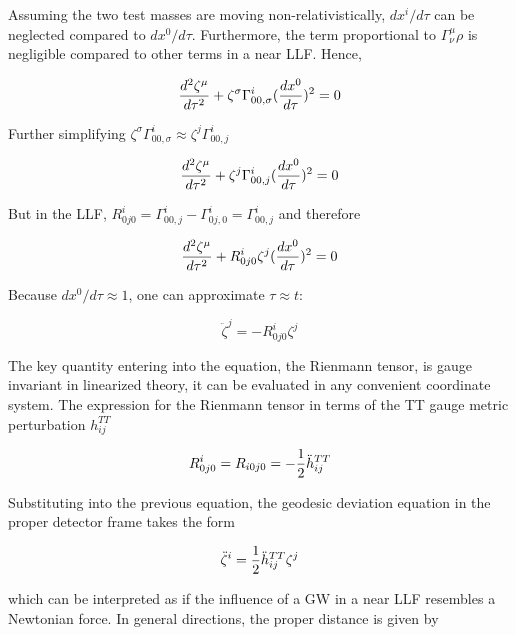 \documentclass[binding=0.6cm, LaM]{sapthesis}
\begin{document}
	Assuming the two test masses are moving non-relativistically, $dx^i/d\tau$ can be neglected compared to $dx^0/d\tau$.
	Furthermore, the term proportional to $\Gamma^{\mu}_\nu\rho{}$ is negligible compared to other terms in a near LLF. Hence,

		\begin{equation}
		{{d^2\zeta^{\mu}}\over{d\tau^2}} + \zeta^{\sigma}\Gamma^{i}_{00, \sigma}({{dx^0}\over{d\tau}})^2 = 0
		\end{equation}

	Further simplifying $\zeta^{\sigma}\Gamma^{i}_{00, \sigma} \approx \zeta^{j}\Gamma^{i}_{00, j}$

		\begin{equation}
		{{d^2\zeta^{\mu}}\over{d\tau^2}} + \zeta^{j}\Gamma^{i}_{00,j}({{dx^0}\over{d\tau}})^2 = 0
		\end{equation}

	But in the LLF, $R^i_{0j0} = \Gamma^i_{00,j} - \Gamma^i_{0j,0} = \Gamma^i_{00,j}$ and therefore

		\begin{equation}
		{{d^2\zeta^{\mu}}\over{d\tau^2}} + R^i_{0j0} \zeta^j({{dx^0}\over{d\tau}})^2 = 0
		\end{equation}

	Because $dx^0/d\tau \approx 1$, one can approximate $\tau \approx t$:

		\begin{equation}
		{\ddot \zeta}^j = - R^i_{0j0}\zeta^j
		\end{equation}
	
	The key quantity entering into the equation, the Rienmann tensor, is gauge invariant in linearized theory, 
	it can be evaluated in any convenient coordinate system.
	The expression for the Rienmann tensor in terms of the TT gauge metric perturbation $h_{ij}^{TT}$

		\begin{equation}
		R^i_{0j0} = R_{i0j0} = - {1 \over 2}{\ddot h}_{ij}^{TT}
		\end{equation}

	Substituting into the previous equation, the geodesic deviation equation in the proper detector frame takes the form

		\begin{equation}
		{\ddot \zeta}^i = {1 \over 2}{\ddot h}_{ij}^{TT}\zeta^j
		\end{equation}

	which can be interpreted as if the influence of a GW in a near LLF resembles a Newtonian force.
	In general directions, the proper distance is given by
\end{document}
